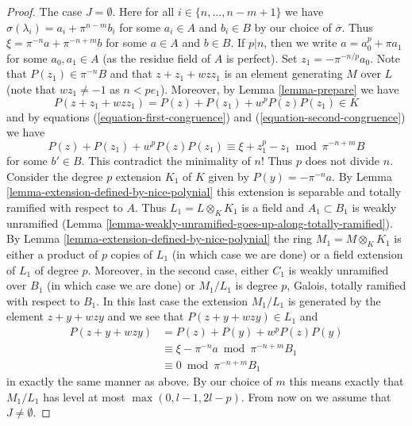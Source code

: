 \documentclass[10pt,a4paper]{amsart}
\theoremstyle{plain}
\theoremstyle{definition}
\theoremstyle{remark}
\numberwithin{equation}{subsection}
\begin{document}
\begin{proof}
\medskip\noindent
The case $J = \emptyset$. Here for all $i \in \{n, \ldots, n - m + 1\}$
we have $\sigma(\lambda_i) = a_i + \pi^{n - m}b_i$ for some $a_i \in A$
and $b_i \in B$ by our choice of $\overline{\sigma}$. Thus
$\xi = \pi^{-n} a + \pi^{-n + m} b$ for some $a \in A$ and $b \in B$.
If $p | n$, then we write $a = a_0^p + \pi a_1$ for some $a_0, a_1 \in A$
(as the residue field of $A$ is perfect). Set $z_1 = - \pi^{-n/p} a_0$.
Note that $P(z_1) \in \pi^{-n}B$ and that $z + z_1 + w z z_1$ is an
element generating $M$ over $L$ (note that $wz_1 \not = -1$ as
$n < pe_1$). Moreover, by Lemma \ref{lemma-prepare} we have
$$
P(z + z_1 + w z z_1) = P(z) + P(z_1) + w^p P(z) P(z_1) \in K
$$
and by equations (\ref{equation-first-congruence}) and
(\ref{equation-second-congruence}) we have
$$
P(z) + P(z_1) + w^p P(z) P(z_1)
\equiv
\xi + z_1^p - z_1 \bmod \pi^{-n + m}B
$$
for some $b' \in B$. This contradict the minimality of $n$! Thus $p$
does not divide $n$. Consider the degree $p$ extension $K_1$ of $K$ given
by $P(y) = -\pi^{-n}a$. By Lemma \ref{lemma-extension-defined-by-nice-polynial}
this extension is separable and totally ramified with respect to $A$.
Thus $L_1 = L \otimes_K K_1$
is a field and $A_1 \subset B_1$ is weakly unramified
(Lemma \ref{lemma-weakly-unramified-goes-up-along-totally-ramified}).
By Lemma \ref{lemma-extension-defined-by-nice-polynial}
the ring $M_1 = M \otimes_K K_1$ is either a product of $p$ copies
of $L_1$ (in which case we are done) or a field extension of $L_1$
of degree $p$. Moreover, in the second case, either $C_1$ is weakly unramified
over $B_1$ (in which case we are done) or $M_1/L_1$ is degree $p$,
Galois, totally ramified with respect to $B_1$.
In this last case the extension $M_1/L_1$
is generated by the element $z + y + wzy$ and we see that
$P(z + y + wzy) \in L_1$ and
\begin{align*}
P(z + y + wzy)
& = P(z) + P(y) + w^p P(z) P(y) \\
& \equiv
\xi - \pi^{-n}a \bmod \pi^{-n + m}B_1 \\
& \equiv
0 \bmod \pi^{-n + m}B_1
\end{align*}
in exactly the same manner as above. By our choice of $m$ this
means exactly that $M_1/L_1$ has level at most $\max(0, l - 1, 2l - p)$.
From now on we assume that $J \not = \emptyset$.


\end{proof}
\end{document}
